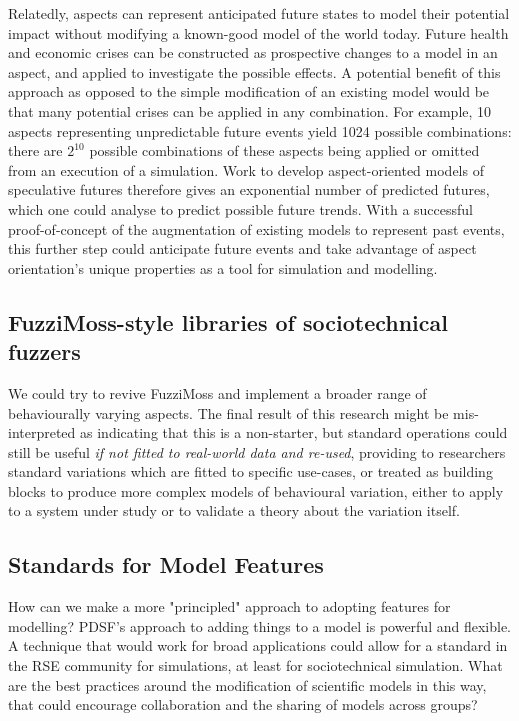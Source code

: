 Relatedly, aspects can represent anticipated future states
to model their potential impact without modifying a known-good model of the
world today. Future health and economic crises can be constructed as prospective
changes to a model in an aspect, and applied to investigate the possible
effects. A potential benefit of this approach as opposed to the simple
modification of an existing model would be that many potential crises can be
applied in any combination. For example, 10 aspects representing unpredictable
future events yield 1024 possible combinations: there are \(2^{10}\) possible
combinations of these aspects being applied or omitted from an execution of a
simulation. Work to develop aspect-oriented models of speculative futures
therefore gives an exponential number of predicted futures, which one could
analyse to predict possible future trends. With a successful proof-of-concept of
the augmentation of existing models to represent past events, this further step
could anticipate future events and take advantage of aspect orientation's unique
properties as a tool for simulation and modelling.


\subsection{FuzziMoss-style libraries of sociotechnical
fuzzers}\label{future_work_revive_fuzzimoss}

We could try to revive FuzziMoss and implement a broader range of behaviourally
varying aspects. The final result of this research might be mis-interpreted as
indicating that this is a non-starter, but standard operations could still be
useful \emph{if not fitted to real-world data and re-used}, providing to
researchers standard variations which are fitted to specific use-cases, or
treated as building blocks to produce more complex models of behavioural
variation, either to apply to a system under study or to validate a theory about
the variation itself.


\subsection{Standards for Model Features}\label{subsec:standard_aosm_techniques}

How can we make a more "principled" approach to adopting features for modelling?
PDSF's approach to adding things to a model is powerful and flexible. A
technique that would work for broad applications could allow for a standard in
the RSE community for simulations, at least for sociotechnical simulation. What
are the best practices around the modification of scientific models in this way,
that could encourage collaboration and the sharing of models across groups?


